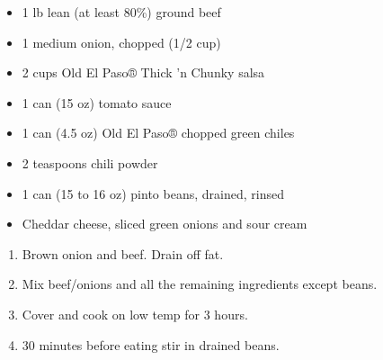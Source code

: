 \fromMom
\ingredients
\begin{itemize}
        \item 1 lb lean (at least 80\%) ground beef
        \item 1 medium onion, chopped (1/2 cup)
        \item 2 cups Old El Paso® Thick 'n Chunky salsa
        \item 1 can (15 oz) tomato sauce
        \item 1 can (4.5 oz) Old El Paso® chopped green chiles
        \item 2 teaspoons chili powder
        \item 1 can (15 to 16 oz) pinto beans, drained, rinsed
         \item Cheddar cheese, sliced green onions and sour cream
\end{itemize}

\instructions
\begin{enumerate}
\def\labelenumi{\arabic{enumi}.}
\item Brown onion and beef. Drain off fat.
\item Mix beef/onions and all the remaining ingredients {except beans}.
\item Cover and cook on low temp for 3 hours.
\item 30 minutes before eating stir in drained beans.
\end{enumerate}
